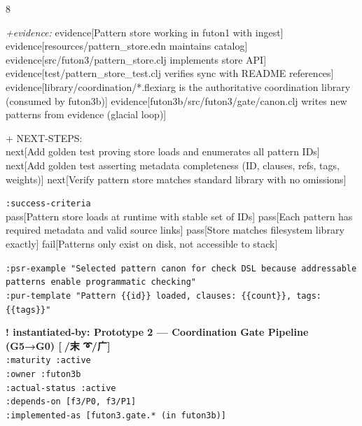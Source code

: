 \documentclass[landscape]{article}
\newcommand{\flexitag}[1]{\textcolor[gray]{0.35}{\textit{#1}}}
\newenvironment{devmapactive}{%
  \def\FrameCommand{\colorbox{devmapactivebg}}%
  \setlength{\fboxsep}{2pt}%
  \MakeFramed{\advance\hsize-\width \FrameRestore}%
}{\endMakeFramed}
\begin{document}
\begin{paracol}{8}
\begin{devmapactive}
  \flexitag{+evidence:} evidence[Pattern store working in futon1 with ingest] evidence[resources/pattern\_store.edn maintains catalog] evidence[src/futon3/pattern\_store.clj implements store API] evidence[test/pattern\_store\_test.clj verifies sync with README references] evidence[library/coordination/*.flexiarg is the authoritative coordination library (consumed by futon3b)] evidence[futon3b/src/futon3/gate/canon.clj writes new patterns from evidence (glacial loop)]\\
\par
  + NEXT-STEPS:\\
    next[Add golden test proving store loads and enumerates all pattern IDs] next[Add golden test asserting metadata completeness (ID, clauses, refs, tags, weights)] next[Verify pattern store matches standard library with no omissions]\\
\par
  \texttt{:\allowbreak{}success-\allowbreak{}criteria}\\
    pass[Pattern store loads at runtime with stable set of IDs] pass[Each pattern has required metadata and valid source links] pass[Store matches filesystem library exactly] fail[Patterns only exist on disk, not accessible to stack]\\
\par
  \texttt{:\allowbreak{}psr-\allowbreak{}example "Selected pattern canon for check DSL because addressable patterns enable programmatic checking"}\\
  \texttt{:\allowbreak{}pur-\allowbreak{}template "Pattern \{\{id\}\} loaded,\allowbreak{} clauses:\allowbreak{} \{\{count\}\},\allowbreak{} tags:\allowbreak{} \{\{tags\}\}"}\\
\par
\par
\end{devmapactive}
\begin{devmapactive}
\textbf{! instantiated-by: Prototype 2 — Coordination Gate Pipeline (G5→G0) [🌽/末 ➰/广]}\\
  \texttt{:\allowbreak{}maturity :\allowbreak{}active}\\
  \texttt{:\allowbreak{}owner :\allowbreak{}futon3b}\\
  \texttt{:\allowbreak{}actual-\allowbreak{}status :\allowbreak{}active}\\
  \texttt{:\allowbreak{}depends-\allowbreak{}on [f3/\allowbreak{}P0,\allowbreak{} f3/\allowbreak{}P1]}\\
  \texttt{:\allowbreak{}implemented-\allowbreak{}as [futon3.gate.* (in futon3b)]}\\

\end{devmapactive}
\end{paracol}
\end{document}
